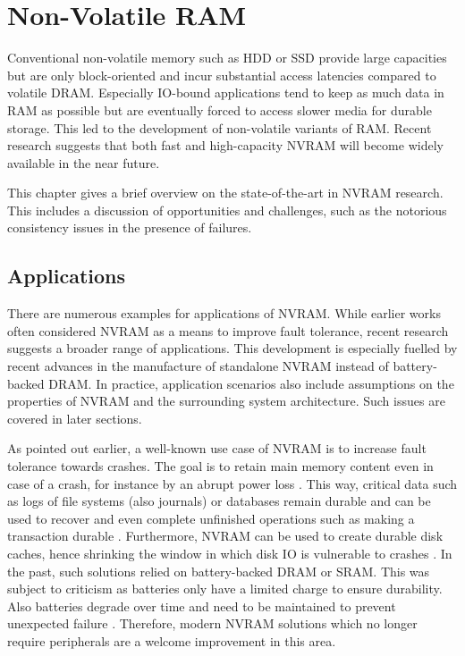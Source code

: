 \chapter{Non-Volatile RAM}
\label{ch:nvram}

Conventional non-volatile memory such as HDD or SSD provide large capacities but are only block-oriented and incur substantial access latencies compared to volatile DRAM. Especially IO-bound applications tend to keep as much data in RAM as possible but are eventually forced to access slower media for durable storage. This led to the development of non-volatile variants of RAM. Recent research suggests that both fast and high-capacity NVRAM will become widely available in the near future.

This chapter gives a brief overview on the state-of-the-art in NVRAM research. This includes a discussion of opportunities and challenges, such as the notorious consistency issues in the presence of failures.

\section{Applications}

There are numerous examples for applications of NVRAM. While earlier works often
considered NVRAM as a means to improve fault tolerance, recent research suggests
a broader range of applications. This development is especially fuelled by
recent advances in the manufacture of standalone NVRAM instead of battery-backed
DRAM. In practice, application scenarios also include assumptions on the
properties of NVRAM and the surrounding system architecture. Such issues are
covered in later sections.

As pointed out earlier, a well-known use case of NVRAM is to increase fault
tolerance towards crashes. The goal is to retain main memory content even in
case of a crash, for instance by an abrupt power loss \cite{molina1992main}.
This way, critical data such as logs of file systems (also journals) or
databases remain durable and can be used to recover and even complete unfinished
operations such as making a transaction durable \cite{liskov1991replication,
chen1996rio}. Furthermore, NVRAM can be used to create durable disk caches,
hence shrinking the window in which disk IO is vulnerable to crashes
\cite{chen1996rio, wu1994envy}. In the past, such solutions relied on
battery-backed DRAM or SRAM. This was subject to criticism as batteries only
have a limited charge to ensure durability. Also batteries degrade over time and
need to be maintained to prevent unexpected failure \cite{molina1992main}.
Therefore, modern NVRAM solutions which no longer require peripherals are a
welcome improvement in this area.

